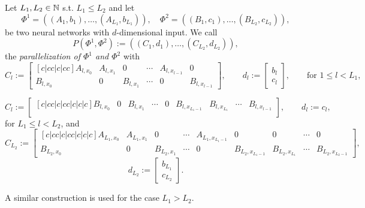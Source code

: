 \begin{definition} \label{def: network parallelization}
    Let $L_1, L_2 \in \mathbb{N}$ s.t. $L_1 \leq L_2$ and let 
    \begin{equation*}
        \Phi^1 = ((A_1, b_1), \dots, (A_{L_1}, b_{L_1})), \quad \Phi^2 = ((B_1, c_1), \dots, (B_{L_2}, c_{L_2})),
    \end{equation*}
    be two neural networks with $d$-dimensional input. We call
    \begin{equation*}
        P(\Phi^1, \Phi^2) := \left( (C_1, d_1), \dots, (C_{L_2}, d_{L_2}) \right),
    \end{equation*}
    the \emph{parallelization of $\Phi^1$ and $\Phi^2$} with
    \begin{equation*}
        C_l := 
        \begin{bmatrix}[c|cc|c|cc]
        A_{l,x_0} & A_{l,x_1} & 0 & \cdots & A_{l,x_{l-1}} & 0 \\
        B_{l,x_0} & 0 & B_{l,x_1} & \cdots & 0 & B_{l,x_{l-1}}
        \end{bmatrix},
        \qquad
        d_l :=
        \begin{bmatrix}
        b_l \\
        c_l
        \end{bmatrix},
        \qquad \text{for } 1 \le l < L_1,
    \end{equation*}

    \begin{equation*}
        C_{l} :=
        \begin{bmatrix}[c|cc|c|cc|c|c|c]
        B_{l,x_0} & 0 & B_{l, x_1} & \cdots & 0 & B_{l, x_{L_1 - 1}} & B_{l, x_{L_1}} & \cdots & B_{l, x_{l-1}} \\
        \end{bmatrix},
        \qquad
        d_{l} := c_{l},
    \end{equation*}
    for $L_1 \leq l < L_2$, and
    \begin{equation*}
        C_{L_2} :=
        \begin{bmatrix}[c|cc|c|cc|c|c|c]
        A_{L_1,x_0} & A_{L_1,x_1} & 0 & \cdots & A_{L_1, x_{L_1 - 1}} & 0 & 0 & \cdots & 0\\
        B_{L_2,x_0} & 0 & B_{L_2,x_1} & \cdots & 0 & B_{L_2,x_{L_1-1}} & B_{L_2, x_{L_1}} & \cdots & B_{L_2, x_{L_2 - 1}}
        \end{bmatrix},
    \end{equation*}
    \begin{equation*}
        d_{L_2} :=
        \begin{bmatrix}
        b_{L_1} \\
        c_{L_2}
        \end{bmatrix}.
    \end{equation*}

    A similar construction is used for the case $L_1 > L_2$.
\end{definition}

